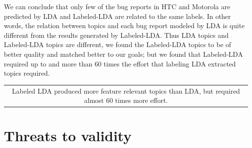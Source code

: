 \documentclass[10pt, conference, compsocconf]{IEEEtran}
\begin{document}


We can conclude that only few of the bug reports in HTC and Motorola
are predicted by LDA and Labeled-LDA are related to the same
labels. In other words, the relation between topics and each bug
report modeled by LDA is quite different from the results generated by
Labeled-LDA. 
Thus LDA topics and Labeled-LDA topics are different, we found the
Labeled-LDA topics to be of better quality and matched better to our
goals; but we found that Labeled-LDA required up to and more than 60
times the effort that labeling LDA extracted topics required.

\vspace*{0.5em}
\begin{tabular}{|c|}
\hline 
\parbox{3.0in}{\centering Labeled LDA produced more feature relevant
  topics than LDA, but required almost 60 times more effort.}
\\
\hline
\end{tabular}



\section{Threats to validity}
\label{sec:threats}
\end{document}
